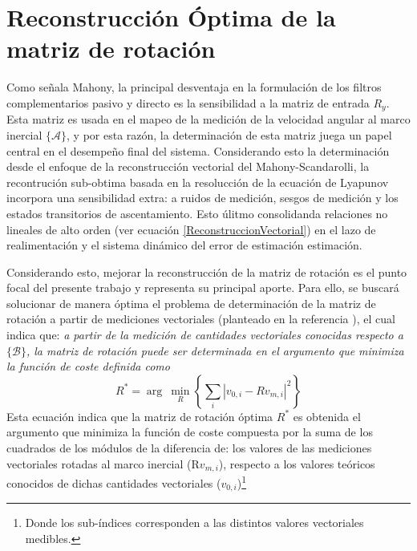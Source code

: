 \documentclass[conference]{IEEEtran}
\newcommand{\marco}[1]{\{\mathcal{#1}\}}
\begin{document}
\section{Reconstrucción Óptima de la matriz de rotación}
Como señala Mahony, la principal desventaja en la formulación de los filtros complementarios pasivo y directo es la sensibilidad a la matriz de entrada $R_y$. Esta matriz es usada en el mapeo de la medición de la velocidad angular al marco inercial $\marco{A}$, y por esta razón, la determinación de esta matriz juega un papel central en el desempeño final del sistema. Considerando esto la determinación desde el enfoque de la reconstrucción vectorial del Mahony-Scandarolli, la recontrución sub-obtima basada en la resolucción de la ecuación de Lyapunov incorpora una sensibilidad extra: a ruidos de medición, sesgos de medición y los estados transitorios de ascentamiento. Esto úlitmo consolidanda relaciones no lineales de alto orden (ver ecuación \ref{ReconstruccionVectorial}) en el lazo de realimentación y el sistema dinámico del error de estimación estimación.\par
Considerando esto, mejorar la reconstrucción de la matriz de rotación es el punto focal del presente trabajo y representa su principal aporte. Para ello, se buscará solucionar de manera óptima el problema de determinación de la matriz de rotación a partir de mediciones vectoriales (planteado en la referencia \cite{Mahony2008}), el cual indica que: \emph{a partir de la medición de cantidades vectoriales conocidas respecto a $\marco{B}$, la matriz de rotación puede ser determinada en el argumento que minimiza la función de coste definida como}
\begin{equation}\label{ProblemaOptimizacion}
R^*=\arg~\min_{R}\left\{\sum_i|v_{0,i}-Rv_{m,i}|^2\right\}
\end{equation}
Esta ecuación indica que la matriz de rotación óptima $R^*$ es obtenida el argumento que minimiza la función de coste compuesta por la suma de los cuadrados de los módulos de la diferencia de: los valores de las mediciones vectoriales rotadas al marco inercial (R$v_{m,i}$), respecto a los valores teóricos conocidos de dichas cantidades vectoriales ($v_{0,i}$)\footnote{Donde los sub-índices corresponden a las distintos valores vectoriales medibles.}
\end{document}
